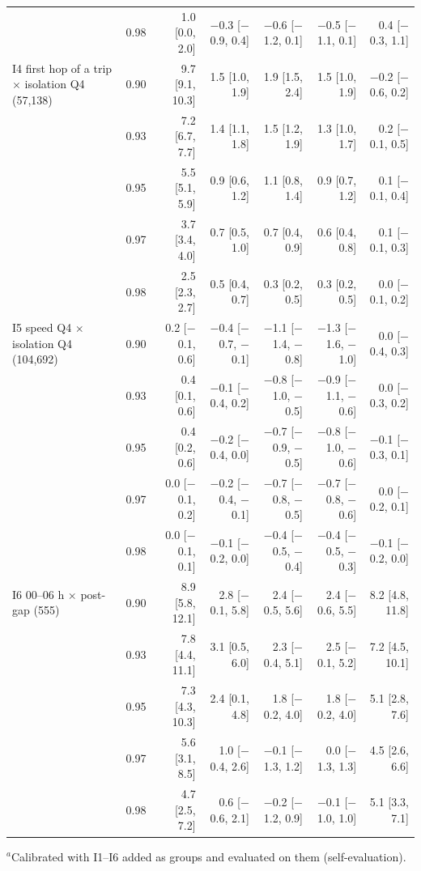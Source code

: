 \begin{tabular}{@{}llrrrrr@{}}
 & 0.98 & 1.0 [0.0, 2.0] & $-$0.3 [$-$0.9, 0.4] & $-$0.6 [$-$1.2, 0.1] & $-$0.5 [$-$1.1, 0.1] & 0.4 [$-$0.3, 1.1] \\
\addlinespace[2pt]
I4 first hop of a trip $\times$ isolation Q4 (57{,}138) & 0.90 & 9.7 [9.1, 10.3] & 1.5 [1.0, 1.9] & 1.9 [1.5, 2.4] & 1.5 [1.0, 1.9] & $-$0.2 [$-$0.6, 0.2] \\
 & 0.93 & 7.2 [6.7, 7.7] & 1.4 [1.1, 1.8] & 1.5 [1.2, 1.9] & 1.3 [1.0, 1.7] & 0.2 [$-$0.1, 0.5] \\
 & 0.95 & 5.5 [5.1, 5.9] & 0.9 [0.6, 1.2] & 1.1 [0.8, 1.4] & 0.9 [0.7, 1.2] & 0.1 [$-$0.1, 0.4] \\
 & 0.97 & 3.7 [3.4, 4.0] & 0.7 [0.5, 1.0] & 0.7 [0.4, 0.9] & 0.6 [0.4, 0.8] & 0.1 [$-$0.1, 0.3] \\
 & 0.98 & 2.5 [2.3, 2.7] & 0.5 [0.4, 0.7] & 0.3 [0.2, 0.5] & 0.3 [0.2, 0.5] & 0.0 [$-$0.1, 0.2] \\
\addlinespace[2pt]
I5 speed Q4 $\times$ isolation Q4 (104{,}692) & 0.90 & 0.2 [$-$0.1, 0.6] & $-$0.4 [$-$0.7, $-$0.1] & $-$1.1 [$-$1.4, $-$0.8] & $-$1.3 [$-$1.6, $-$1.0] & 0.0 [$-$0.4, 0.3] \\
 & 0.93 & 0.4 [0.1, 0.6] & $-$0.1 [$-$0.4, 0.2] & $-$0.8 [$-$1.0, $-$0.5] & $-$0.9 [$-$1.1, $-$0.6] & 0.0 [$-$0.3, 0.2] \\
 & 0.95 & 0.4 [0.2, 0.6] & $-$0.2 [$-$0.4, 0.0] & $-$0.7 [$-$0.9, $-$0.5] & $-$0.8 [$-$1.0, $-$0.6] & $-$0.1 [$-$0.3, 0.1] \\
 & 0.97 & 0.0 [$-$0.1, 0.2] & $-$0.2 [$-$0.4, $-$0.1] & $-$0.7 [$-$0.8, $-$0.5] & $-$0.7 [$-$0.8, $-$0.6] & 0.0 [$-$0.2, 0.1] \\
 & 0.98 & 0.0 [$-$0.1, 0.1] & $-$0.1 [$-$0.2, 0.0] & $-$0.4 [$-$0.5, $-$0.4] & $-$0.4 [$-$0.5, $-$0.3] & $-$0.1 [$-$0.2, 0.0] \\
\addlinespace[2pt]
I6 00--06 h $\times$ post-gap (555) & 0.90 & 8.9 [5.8, 12.1] & 2.8 [$-$0.1, 5.8] & 2.4 [$-$0.5, 5.6] & 2.4 [$-$0.6, 5.5] & 8.2 [4.8, 11.8] \\
 & 0.93 & 7.8 [4.4, 11.1] & 3.1 [0.5, 6.0] & 2.3 [$-$0.4, 5.1] & 2.5 [$-$0.1, 5.2] & 7.2 [4.5, 10.1] \\
 & 0.95 & 7.3 [4.3, 10.3] & 2.4 [0.1, 4.8] & 1.8 [$-$0.2, 4.0] & 1.8 [$-$0.2, 4.0] & 5.1 [2.8, 7.6] \\
 & 0.97 & 5.6 [3.1, 8.5] & 1.0 [$-$0.4, 2.6] & $-$0.1 [$-$1.3, 1.2] & 0.0 [$-$1.3, 1.3] & 4.5 [2.6, 6.6] \\
 & 0.98 & 4.7 [2.5, 7.2] & 0.6 [$-$0.6, 2.1] & $-$0.2 [$-$1.2, 0.9] & $-$0.1 [$-$1.0, 1.0] & 5.1 [3.3, 7.1] \\
\bottomrule
\end{tabular}

\smallskip\parbox{\linewidth}{\footnotesize $^{a}$Calibrated with I1--I6 added as groups and evaluated on them (self-evaluation).}

